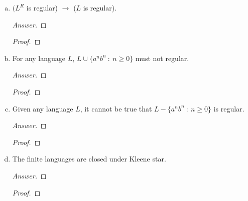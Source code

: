 \documentclass[10pt]{article}
\begin{document}
\begin{enumerate}[1)]
\begin{enumerate}[a)]
\item
$(L^R$ is regular) $\rightarrow$ ($L$ is regular).
\begin{proof}[Answer]
\end{proof}
\begin{proof}[Proof]
\end{proof}

\item
For any language $L$, $L \cup \{a^nb^n\ :\ n \geq 0\}$ must not regular.
\begin{proof}[Answer]
\end{proof}
\begin{proof}[Proof]
\end{proof}

\item
Given any language $L$, it cannot be true that $L - \{a^nb^n\ :\ n \geq 0\}$ is regular.
\begin{proof}[Answer]
\end{proof}
\begin{proof}[Proof]
\end{proof}

\item
The finite languages are closed under Kleene star.
\begin{proof}[Answer]
\end{proof}
\begin{proof}[Proof]
\end{proof}
\end{enumerate}
\end{enumerate}
\end{document}
